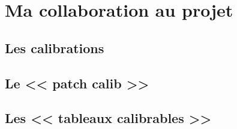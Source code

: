 \chapter{Ma collaboration au projet}
\putminitoc
\lipsum[3]

\section{Les calibrations}
\section{Le << patch calib >>}
\section{Les << tableaux calibrables >>}
